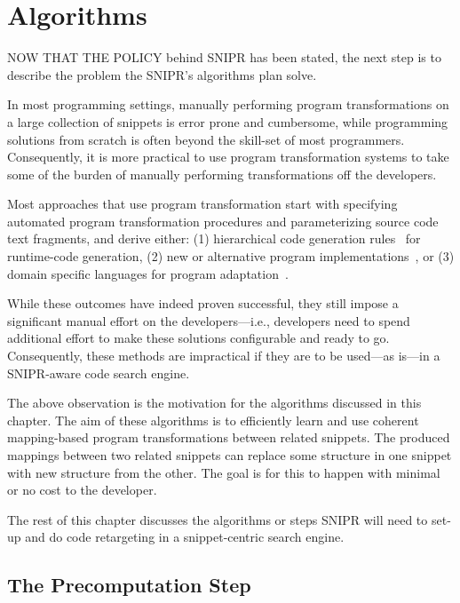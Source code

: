 \chapter{Algorithms}{}
\label{chap:algorithms}

\lettrine[lraise=0.1, nindent=0em, slope=-.5em]{N}{OW THAT THE POLICY} behind \uppercase{SNIPR} has been stated, the next step is to describe the problem the SNIPR's algorithms plan solve.

In most programming settings, manually performing program transformations on a large collection of snippets is error prone and cumbersome, while programming solutions from scratch is often beyond the skill-set of most programmers. Consequently, it is more practical to use program transformation systems to take some of the burden of manually performing transformations off the developers.

Most approaches that use program transformation start with specifying automated program transformation procedures and parameterizing source code text fragments, and derive either: (1) hierarchical code generation rules~\cite{Nita:2010en} for runtime-code generation, (2) new or alternative program implementations~\cite{Wightman:2012gc}, or (3) domain specific languages for program adaptation~\cite{Visser:2001tc}.

While these outcomes have indeed proven successful, they still impose a significant manual effort on the developers---i.e., developers need to spend additional effort to make these solutions configurable and ready to go. Consequently, these methods are impractical if they are to be used---as is---in a \uppercase{SNIPR}-aware code search engine. 

The above observation is the motivation for the algorithms discussed in this chapter. The aim of these algorithms is to efficiently learn and use coherent mapping-based program transformations between related snippets. The produced mappings between two related snippets can replace some structure in one snippet with new structure from the other. The goal is for this to happen with minimal or no cost to the developer. 

The rest of this chapter discusses the algorithms or steps \uppercase{SnipR} will need to set-up and do code retargeting in a snippet-centric search engine.

\section{The Precomputation Step}
\label{sec:precomputation}

